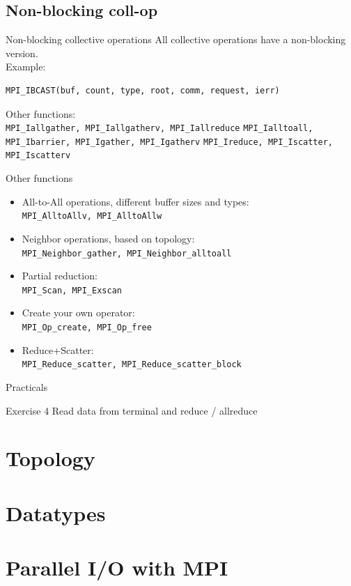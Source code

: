 \documentclass[aspectratio=43]{beamer}
\begin{document}
\subsection{Non-blocking coll-op}
\begin{frame}[fragile]{Non-blocking collective operations}
All collective operations have a non-blocking version.\\
Example:
\footnotesize
\begin{verbatim}
MPI_IBCAST(buf, count, type, root, comm, request, ierr)
\end{verbatim}
\normalsize
Other functions:\\
\verb+MPI_Iallgather, MPI_Iallgatherv, MPI_Iallreduce+
\verb+MPI_Ialltoall, MPI_Ibarrier, MPI_Igather, MPI_Igatherv+
\verb+MPI_Ireduce, MPI_Iscatter, MPI_Iscatterv+
\end{frame}

\begin{frame}[fragile]{Other functions}
\begin{itemize}
    \item All-to-All operations, different buffer sizes and types:\\\hspace{1cm}\verb+MPI_AlltoAllv, MPI_AlltoAllw+
    \item Neighbor operations, based on topology:\\\hspace{1cm}\verb+MPI_Neighbor_gather, MPI_Neighbor_alltoall+
    \item Partial reduction:\\\hspace{1cm}\verb+MPI_Scan, MPI_Exscan+
    \item Create your own operator:\\\hspace{1cm}\verb+MPI_Op_create, MPI_Op_free+
    \item Reduce+Scatter:\\\hspace{1cm}\verb+MPI_Reduce_scatter, MPI_Reduce_scatter_block+
\end{itemize}
\end{frame}

\begin{frame}{Practicals}
    \begin{brown2block}{Exercise 4}
        Read data from terminal and reduce / allreduce
    \end{brown2block}
\end{frame}

\section{Topology}
\section{Datatypes}
\section{Parallel I/O with MPI}

\end{document}
